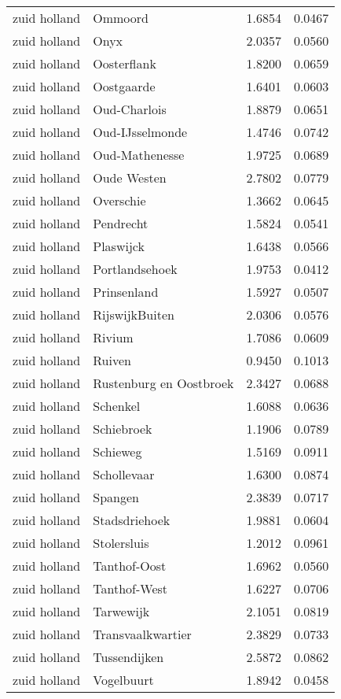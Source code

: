 \begin{longtable}{llcc}
zuid holland & Ommoord & 1.6854 & 0.0467 \\
zuid holland & Onyx & 2.0357 & 0.0560 \\
zuid holland & Oosterflank & 1.8200 & 0.0659 \\
zuid holland & Oostgaarde & 1.6401 & 0.0603 \\
zuid holland & Oud-Charlois & 1.8879 & 0.0651 \\
zuid holland & Oud-IJsselmonde & 1.4746 & 0.0742 \\
zuid holland & Oud-Mathenesse & 1.9725 & 0.0689 \\
zuid holland & Oude Westen & 2.7802 & 0.0779 \\
zuid holland & Overschie & 1.3662 & 0.0645 \\
zuid holland & Pendrecht & 1.5824 & 0.0541 \\
zuid holland & Plaswijck & 1.6438 & 0.0566 \\
zuid holland & Portlandsehoek & 1.9753 & 0.0412 \\
zuid holland & Prinsenland & 1.5927 & 0.0507 \\
zuid holland & RijswijkBuiten & 2.0306 & 0.0576 \\
zuid holland & Rivium & 1.7086 & 0.0609 \\
zuid holland & Ruiven & 0.9450 & 0.1013 \\
zuid holland & Rustenburg en Oostbroek & 2.3427 & 0.0688 \\
zuid holland & Schenkel & 1.6088 & 0.0636 \\
zuid holland & Schiebroek & 1.1906 & 0.0789 \\
zuid holland & Schieweg & 1.5169 & 0.0911 \\
zuid holland & Schollevaar & 1.6300 & 0.0874 \\
zuid holland & Spangen & 2.3839 & 0.0717 \\
zuid holland & Stadsdriehoek & 1.9881 & 0.0604 \\
zuid holland & Stolersluis & 1.2012 & 0.0961 \\
zuid holland & Tanthof-Oost & 1.6962 & 0.0560 \\
zuid holland & Tanthof-West & 1.6227 & 0.0706 \\
zuid holland & Tarwewijk & 2.1051 & 0.0819 \\
zuid holland & Transvaalkwartier & 2.3829 & 0.0733 \\
zuid holland & Tussendijken & 2.5872 & 0.0862 \\
zuid holland & Vogelbuurt & 1.8942 & 0.0458 \\

\end{longtable}
